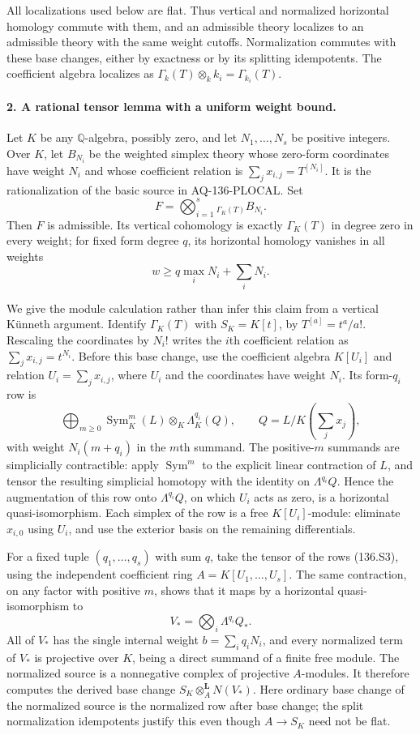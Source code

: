 All localizations used below are flat. Thus vertical and
normalized horizontal homology commute with them, and an
admissible theory localizes to an admissible theory with
the same weight cutoffs. Normalization commutes with these
base changes, either by exactness or by its splitting
idempotents. The coefficient algebra localizes as
$\Gamma_k(T)\otimes_k k_i=\Gamma_{k_i}(T)$.

\paragraph{2. A rational tensor lemma with a uniform weight bound.}
Let $K$ be any $\mathbb Q$-algebra, possibly zero, and let
$N_1,\ldots,N_s$ be positive integers. Over $K$, let $B_{N_i}$
be the weighted simplex theory whose zero-form coordinates
have weight $N_i$ and whose coefficient relation is
$\sum_jx_{i,j}=T^{[N_i]}$. It is the rationalization of
the basic source in AQ-136-PLOCAL. Set
\[
 F=\bigotimes_{i=1}^s{}_{\Gamma_K(T)}B_{N_i}.
\]
Then $F$ is admissible. Its vertical cohomology is exactly
$\Gamma_K(T)$ in degree zero in every weight; for fixed
form degree $q$, its horizontal homology vanishes in all
weights
\[
                    w\ge q\max_iN_i+\sum_iN_i.           \tag{136.S2}
\]

We give the module calculation rather than infer this claim
from a vertical K\"unneth argument. Identify
$\Gamma_K(T)$ with $S_K=K[t]$, by $T^{[a]}=t^a/a!$.
Rescaling the coordinates by $N_i!$ writes the $i$th
coefficient relation as $\sum_jx_{i,j}=t^{N_i}$.
Before this base change, use the coefficient algebra
$K[U_i]$ and relation $U_i=\sum_jx_{i,j}$, where $U_i$
and the coordinates have weight $N_i$. Its form-$q_i$
row is
\[
 \bigoplus_{m\ge0}\operatorname{Sym}^m_K(L)
                         \otimes_K\Lambda^{q_i}_K(Q),
 \qquad Q=L/K\!\left(\sum_jx_j\right),                 \tag{136.S3}
\]
with weight $N_i(m+q_i)$ in the $m$th summand.
The positive-$m$ summands are simplicially contractible:
apply $\operatorname{Sym}^m$ to the explicit linear
contraction of $L$, and tensor the resulting simplicial
homotopy with the identity on $\Lambda^{q_i}Q$.
Hence the augmentation of this row onto
$\Lambda^{q_i}Q$, on which $U_i$ acts as zero, is a
horizontal quasi-isomorphism. Each simplex of the row
is a free $K[U_i]$-module: eliminate $x_{i,0}$ using
$U_i$, and use the exterior basis on the remaining
differentials.

For a fixed tuple $(q_1,\ldots,q_s)$ with sum $q$, take
the tensor of the rows (136.S3), using the independent
coefficient ring $A=K[U_1,\ldots,U_s]$.
The same contraction, on any factor with positive $m$,
shows that it maps by a horizontal quasi-isomorphism to
\[
                V_* =\bigotimes_i\Lambda^{q_i}Q_*.
\]
All of $V_*$ has the single internal weight
$b=\sum_iq_iN_i$, and every normalized term of $V_*$
is projective over $K$, being a direct summand of a
finite free module. The normalized source is a
nonnegative complex of projective $A$-modules. It
therefore computes the derived base change
$S_K\otimes_A^{\mathbf L}N(V_*)$.
Here ordinary base change of the normalized source is
the normalized row after base change; the split
normalization idempotents justify this even though
$A\to S_K$ need not be flat.

